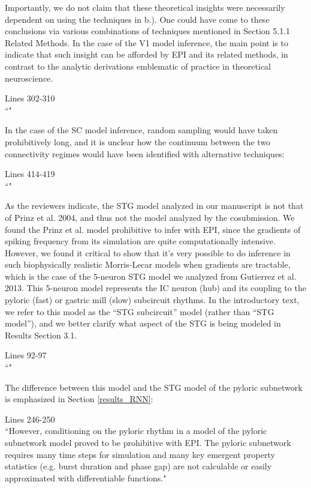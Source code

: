 \documentclass[11pt,a4paper]{article}
\begin{document}
Importantly, we do not claim that these theoretical insights were necessarily dependent on using the techniques in b.).  
One could have come to these conclusions via various combinations of techniques mentioned in Section 5.1.1 Related Methods.
In the case of the V1 model inference, the main point is to indicate that such insight can be afforded by EPI and its related methods, in contrast to the analytic derivations emblematic of practice in theoretical neuroscience.
\begin{displayquote}
Lines 302-310 \\
``"
\end{displayquote}
In the case of the SC model inference, random sampling would have taken prohibitively long, and it is unclear how the continuum between the two connectivity regimes would have been identified with alternative techniques:
\begin{displayquote}
Lines 414-419 \\
``"
\end{displayquote}
 
As the reviewers indicate, the STG model analyzed in our manuscript is not that of Prinz et al. 2004, and thus not the model analyzed by the cosubmission.  We found the Prinz et al. model prohibitive to infer with EPI, since the gradients of spiking frequency from its simulation are quite computationally intensive.  However, we found it critical to show that it’s very possible to do inference in such biophysically realistic Morris-Lecar models when gradients are tractable, which is the case of the 5-neuron STG model we analyzed from Gutierrez et al. 2013.  This 5-neuron model represents the IC neuron (hub) and its coupling to the pyloric (fast) or gastric mill (slow) subcircuit rhythms.  In the introductory text, we refer to this model as the “STG subcircuit” model (rather than “STG model”), and we better clarify what aspect of the STG is being modeled in Results Section 3.1. 

\begin{displayquote}
Lines 92-97 \\
``"
\end{displayquote}

The difference between this model and the STG model of the pyloric subnetwork is emphasized in Section \ref{results_RNN}:

\begin{displayquote}
Lines 246-250 \\
``However, conditioning on the pyloric rhythm \cite{marder1992dynamic} in a model of the pyloric subnetwork model \cite{prinz2004similar} proved to be prohibitive with EPI.
The pyloric subnetwork requires many time steps for simulation and many key emergent property statistics (e.g. burst duration and phase gap) are not calculable or easily approximated with differentiable functions."
\end{displayquote}
\end{document}
